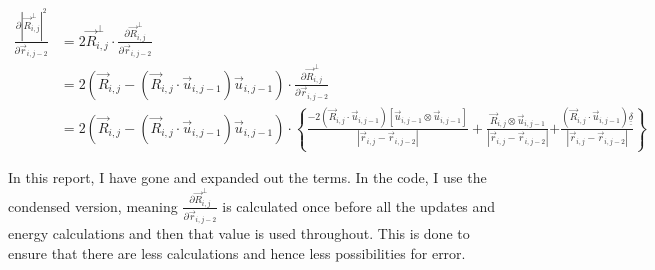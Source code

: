 \documentclass{article}
\renewcommand{\ij}{_{i,j}}
\newcommand{\ijj}{_{i,j-1}}
\newcommand{\ijjj}{_{i,j-2}}
\newcommand{\magn}[1]{\left\vert #1 \right\vert }
\renewcommand{\part}[2]{\frac{\partial #1 }{\partial #2}}
\newcommand{\ten}[1]{\underline{\underline{#1}}}
\newcommand{\rij}{\vec{r} \ij}
\newcommand{\Rij}{\vec{R} \ij}
\newcommand{\rijjj}{\vec{r} \ijjj}
\newcommand{\uijj}{\vec{u} \ijj}
\begin{document}
\begin{align*}
  \part{
    \magn{\Rij^\perp}^2
  }{ \rijjj }
  &= 
  2 \Rij^\perp \cdot \part{\Rij^\perp}{\rijjj}
  \\
  &= 
  2
  \left(
  \vec{R} \ij 
  - 
  \left(\vec{R} \ij \cdot \vec{u} \ijj \right) 
  \vec{u} \ijj 
  \right)
  \cdot 
  \part{\Rij^\perp}{\rijjj}
  \\
  &= 
  2
  \left(
  \vec{R} \ij 
  - 
  \left(\vec{R} \ij \cdot \vec{u} \ijj \right) 
  \vec{u} \ijj 
  \right)
  \cdot 
  \left\{
    \frac{
      -
  2
      \left(
        \Rij\cdot \uijj 
      \right)
      \left[
       \uijj 
      \otimes \uijj 
      \right]
      }{\magn{\rij - \rijjj}}
       + 
    \frac{
  \Rij 
  \otimes \uijj 
      }{\magn{\rij - \rijjj}}
  {
    +
  \frac{
  \left(
    \Rij 
    \cdot 
    \uijj 
  \right)
  \ten{\delta}
    }{\magn{\rij - \rijjj}}
  }
  \right\}
\end{align*}


In this report, I have gone and expanded out the terms. In the code, I use the
condensed version, meaning \(  \part{\Rij^\perp}{\rijjj}\) is calculated once
before all the updates and energy calculations and then that value is used
throughout. This is done to ensure that there are less calculations and hence
less possibilities for error.
\end{document}
